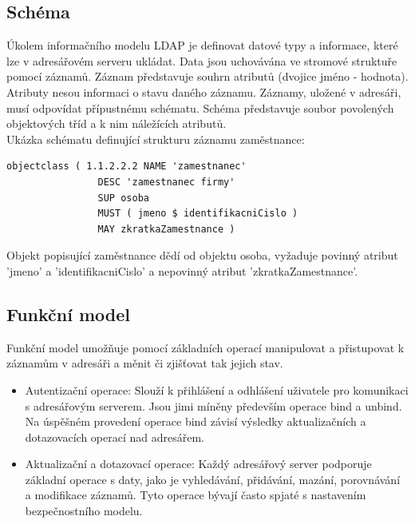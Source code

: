 \documentclass{diplomka}
\begin{document}
\subsection*{Schéma}
Úkolem informačního modelu LDAP je definovat datové typy a informace, které lze v adresářovém serveru ukládat. Data jsou uchovávána ve stromové struktuře pomocí záznamů. Záznam představuje souhrn atributů (dvojice jméno - hodnota). Atributy nesou informaci o stavu daného záznamu. Záznamy, uložené v adresáři, musí odpovídat přípustnému schématu. Schéma  představuje soubor povolených objektových tříd a k nim náležících atributů.\\
Ukázka schématu definující strukturu záznamu zaměstnance:
\begin{verbatim}
objectclass ( 1.1.2.2.2 NAME 'zamestnanec'
                DESC 'zamestnanec firmy'
                SUP osoba
                MUST ( jmeno $ identifikacniCislo )
                MAY zkratkaZamestnance )
\end{verbatim}

Objekt popisující zaměstnance dědí od objektu osoba, vyžaduje povinný atribut 'jmeno' a 'identifikacniCislo' a nepovinný atribut 'zkratkaZamestnance'.

\subsection*{Funkční model}
Funkční model umožňuje pomocí základních operací manipulovat a přistupovat k záznamům v adresáři a měnit či zjišťovat tak jejich stav.
\begin{itemize}[noitemsep,nolistsep]
\item Autentizační operace: Slouží k přihlášení a odhlášení uživatele pro komunikaci s adresářovým serverem. Jsou jimi míněny především operace bind a unbind. Na úspěšném provedení operace bind závisí výsledky aktualizačních a dotazovacích operací nad adresářem.
\item Aktualizační a dotazovací operace: Každý adresářový server podporuje základní operace s daty, jako je vyhledávání, přidávání, mazání, porovnávání a modifikace záznamů. Tyto operace bývají často spjaté s nastavením bezpečnostního modelu.
\end{itemize}
\end{document}
